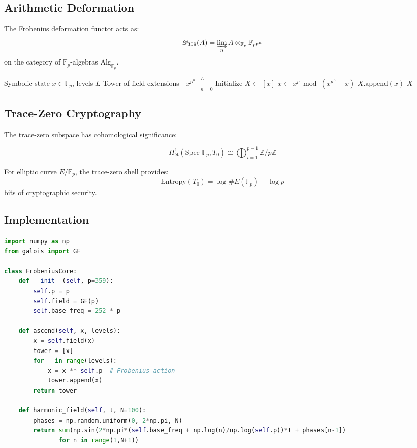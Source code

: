 \documentclass[12pt]{article}
\begin{document}
\subsection{Arithmetic Deformation}
\begin{definition}
The Frobenius deformation functor acts as:
\[
\mathscr{D}_{359}(A) = \varinjlim_n A \otimes_{\mathbb{F}_p} \mathbb{F}_{p^{p^n}}
\]
on the category of $\mathbb{F}_p$-algebras $\text{Alg}_{\mathbb{F}_p}$.
\end{definition}

\begin{algorithm}[H]
\caption{Frobenius Endomorphism Ascension}
\begin{algorithmic}[1]
\Require Symbolic state $x \in \mathbb{F}_p$, levels $L$
\Ensure Tower of field extensions $[x^{p^n}]_{n=0}^L$
\State Initialize $X \gets [x]$
    \State $x \gets x^p \bmod (x^{p^L}-x)$ 
    \State $X.\text{append}(x)$
\EndFor
\State \Return $X$
\end{algorithmic}
\end{algorithm}

\subsection{Trace-Zero Cryptography}
The trace-zero subspace has cohomological significance:

\begin{equation}
H^1_{\text{\'et}}(\text{Spec }\mathbb{F}_p, T_0) \cong \bigoplus_{i=1}^{p-1} \mathbb{Z}/p\mathbb{Z}
\end{equation}

\begin{proposition}
For elliptic curve $E/\mathbb{F}_p$, the trace-zero shell provides:
\[
\text{Entropy}(T_0) = \log \#E(\mathbb{F}_p) - \log p
\]
bits of cryptographic security.
\end{proposition}

\subsection{Implementation}
\begin{lstlisting}[language=Python,caption={Frobenius Ascension Engine}]
import numpy as np
from galois import GF

class FrobeniusCore:
    def __init__(self, p=359):
        self.p = p
        self.field = GF(p)
        self.base_freq = 252 * p
        
    def ascend(self, x, levels):
        x = self.field(x)
        tower = [x]
        for _ in range(levels):
            x = x ** self.p  # Frobenius action
            tower.append(x)
        return tower
        
    def harmonic_field(self, t, N=100):
        phases = np.random.uniform(0, 2*np.pi, N)
        return sum(np.sin(2*np.pi*(self.base_freq + np.log(n)/np.log(self.p))*t + phases[n-1])
               for n in range(1,N+1))
\end{lstlisting}
\end{document}
